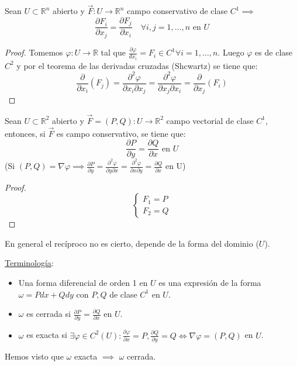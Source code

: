 \begin{proposición}
Sean $U \subset \mathbb{R}^n$ abierto y $\vec{F}: U \to \mathbb{R}^n$ campo conservativo de clase $C^1 \implies$ $$\frac{\partial F_i}{\partial x_j} = \frac{\partial F_j}{\partial x_i} \quad \forall i,j = 1, \ldots, n \text{ en } U$$
\end{proposición}
\begin{proof}
    Tomemos $\varphi: U \to \mathbb{R}$ tal que $\frac{\partial\varphi}{dx_i} = F_i \in C^1 \forall i = 1, \ldots, n$. Luego $\varphi$ es de clase $C^2$ y por el teorema de las derivadas cruzadas (Shcwartz) se tiene que:
    $$\frac{\partial}{\partial x_i}(F_j) = \frac{\partial^2 \varphi}{\partial x_i \partial x_j} = \frac{\partial^2 \varphi}{\partial x_j \partial x_i} = \frac{\partial}{\partial x_j}(F_i)$$
\end{proof}
\begin{corolario}
    Sean $U \subset \mathbb{R}^2$ abierto y $\vec{F} = (P, Q): U \to \mathbb{R}^2$ campo vectorial de clase $C^1$, entonces, si $\vec{F}$ es campo conservativo, se tiene que:
    $$\frac{\partial P}{\partial y} = \frac{\partial Q}{\partial x} \text{ en } U$$
    (Si $(P, Q) = \nabla \varphi \implies \frac{\partial P}{\partial y} = \frac{\partial^2 \varphi}{\partial y \partial x} = \frac{\partial^2 \varphi}{\partial x \partial y} = \frac{\partial Q}{\partial x}$ en U)
\end{corolario}
\begin{proof}
    $$\begin{cases}
            F_1 = P \\ F_2 = Q
        \end{cases}$$
\end{proof}
\begin{observación}
En general el recíproco no es cierto, depende de la forma del dominio ($U$).
\end{observación}
\begin{observación}
\underline{Terminología}:
\begin{itemize}
    \item Una forma diferencial de orden 1 en $U$ es una expresión de la forma $\omega =
              Pdx + Qdy$ con $P, Q$ de clase $C^1$ en $U$.
    \item $\omega$ es cerrada si $\frac{\partial P}{\partial y} = \frac{\partial Q}{\partial x}$ en $U$.
    \item $\omega$ es exacta si $\exists \varphi \in C^2(U) : \frac{\partial\varphi}{\partial x} = P, \frac{\partial Q}{\partial y} = Q \iff \nabla \varphi = (P, Q)$ en $U$.
\end{itemize}
Hemos visto que $\omega$ exacta $\implies$ $\omega$ cerrada.
\end{observación}

